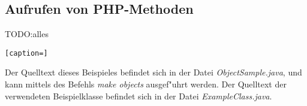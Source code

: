 \subsection{Aufrufen von PHP-Methoden}
\label{sec:app1:invoke}
TODO:alles
\begin{lstlisting}[caption=]
\end{lstlisting}

Der Quelltext dieses Beispieles befindet sich in der Datei \emph{ObjectSample.java}, 
und kann mittels des Befehls \emph{make objects} ausgef"uhrt werden. Der Quelltext der
verwendeten Beispielklasse befindet sich in der Datei \emph{ExampleClass.java}.

